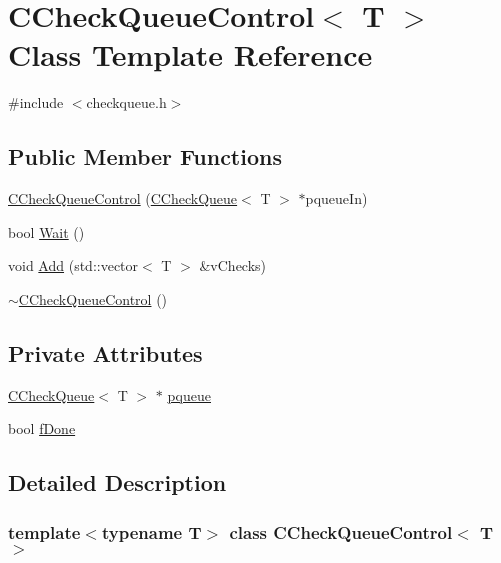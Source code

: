 \hypertarget{class_c_check_queue_control}{}\section{C\+Check\+Queue\+Control$<$ T $>$ Class Template Reference}
\label{class_c_check_queue_control}


{\ttfamily \#include $<$checkqueue.\+h$>$}

\subsection*{Public Member Functions}
\begin{DoxyCompactItemize}
\item 
\mbox{\hyperlink{class_c_check_queue_control_ae690afca20574a7c98e0c5e82011c606}{C\+Check\+Queue\+Control}} (\mbox{\hyperlink{class_c_check_queue}{C\+Check\+Queue}}$<$ T $>$ $\ast$pqueue\+In)
\item 
bool \mbox{\hyperlink{class_c_check_queue_control_ab31d809a76b876d21608c0c5d0e3baf0}{Wait}} ()
\item 
void \mbox{\hyperlink{class_c_check_queue_control_aa11e8248c91b0758b39132db4090ff8d}{Add}} (std\+::vector$<$ T $>$ \&v\+Checks)
\item 
\mbox{\hyperlink{class_c_check_queue_control_afc8a9f044b4559a04ff3569cff5d2f94}{$\sim$\+C\+Check\+Queue\+Control}} ()
\end{DoxyCompactItemize}
\subsection*{Private Attributes}
\begin{DoxyCompactItemize}
\item 
\mbox{\hyperlink{class_c_check_queue}{C\+Check\+Queue}}$<$ T $>$ $\ast$ \mbox{\hyperlink{class_c_check_queue_control_a5ac89e097f74678003bbc66f412dbe70}{pqueue}}
\item 
bool \mbox{\hyperlink{class_c_check_queue_control_aa0ad068367707596c7fcb710fc095845}{f\+Done}}
\end{DoxyCompactItemize}


\subsection{Detailed Description}
\subsubsection*{template$<$typename T$>$\newline
class C\+Check\+Queue\+Control$<$ T $>$}

